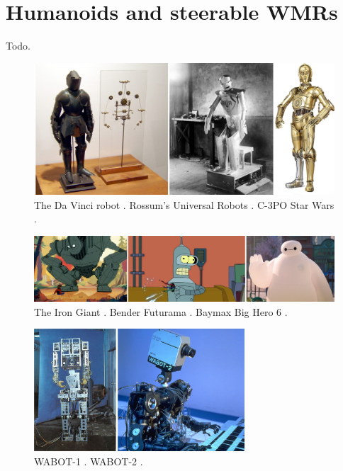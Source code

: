 \chapter{Humanoids and steerable WMRs}
\label{ch:humanoids-and-swmrs}
Todo. 

\begin{figure}
    \centering
    \includegraphics[width=\textwidth]{figures/01-introduction/robot-history.jpg}
    \caption{The Da Vinci robot \cite{Moran2006TheDaVinciRobot}.
        Rossum's Universal Robots \cite{Capek1920RUR}.
        C-3PO Star Wars \cite{StarWars1977}.
    }
    \label{fig:introduction:robots-in-history}
\end{figure}

\begin{figure}
    \centering
    \includegraphics[width=\textwidth]{figures/01-introduction/robots-in-animation.jpg}
    \caption{The Iron Giant \cite{TheIronGiant1999}.
        Bender Futurama \cite{Futurama1999}.
        Baymax Big Hero 6 \cite{BigHero62014}.
    }
    \label{fig:introduction:robots-in-animation}
\end{figure}

\begin{figure}
    \centering
    \includegraphics[width=0.7\textwidth]{figures/01-introduction/WABOTs.jpg}
    \caption{WABOT-1 \cite{Kato1973TheWABOT1}. WABOT-2 \cite{Kato1987WABOT2}.}
    \label{fig:introduction:WABOTs}
\end{figure}

